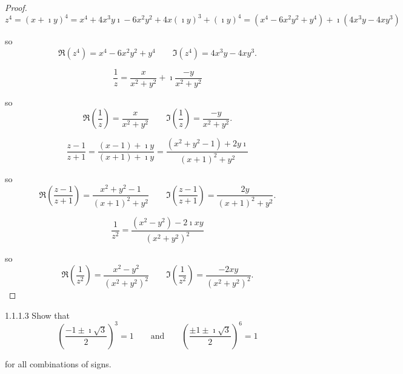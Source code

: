 \begin{proof}
	\[
		z^{4} = {(x + \imath y)}^{4} = x^{4} + 4x^{3}y\imath - 6x^{2}y^{2} + 4x {(\imath y)}^{3} + {(\imath y)}^{4} = (x^{4} - 6x^{2}y^{2} + y^{4}) + \imath (4x^{3}y - 4xy^{3})
	\]

	so
	\[
		\Re(z^{4}) = x^{4} - 6x^{2}y^{2} + y^{4}\qquad \Im(z^{4}) = 4x^{3}y - 4xy^{3}.
	\]

	\[
		\dfrac{1}{z} = \dfrac{x}{x^{2} + y^{2}} + \imath\dfrac{-y}{x^{2} + y^{2}}
	\]

	so
	\[
		\Re\left( \dfrac{1}{z} \right) = \dfrac{x}{x^{2} + y^{2}} \qquad \Im\left( \dfrac{1}{z} \right) = \dfrac{-y}{x^{2} + y^{2}}.
	\]

	\[
		\dfrac{z - 1}{z + 1} = \dfrac{(x - 1) + \imath y}{(x + 1) + \imath y} = \dfrac{(x^{2} + y^{2} - 1) + 2y \imath}{{(x + 1)}^{2} + y^{2}}
	\]

	so
	\[
		\Re\left( \dfrac{z - 1}{z + 1} \right) = \dfrac{x^{2} + y^{2} - 1}{{(x + 1)}^{2} + y^{2}} \qquad \Im\left( \dfrac{z - 1}{z + 1} \right) = \dfrac{2y}{{(x + 1)}^{2} + y^{2}}.
	\]

	\[
		\dfrac{1}{z^{2}} = \dfrac{(x^{2} - y^{2}) - 2\imath xy}{{(x^{2} + y^{2})}^{2}}
	\]

	so
	\[
		\Re\left(\dfrac{1}{z^{2}}\right) = \dfrac{x^{2} - y^{2}}{{(x^{2} + y^{2})}^{2}} \qquad \Im\left(\dfrac{1}{z^{2}}\right) = \dfrac{-2xy}{{(x^{2} + y^{2})}^{2}}.
	\]
\end{proof}

\begin{problem}{1.1.1.3}
Show that
\[
	{\left( \dfrac{-1 \pm \imath\sqrt{3}}{2} \right)}^{3} = 1 \qquad \text{and} \qquad {\left( \dfrac{\pm 1 \pm \imath\sqrt{3}}{2} \right)}^{6} = 1
\]

for all combinations of signs.
\end{problem}

